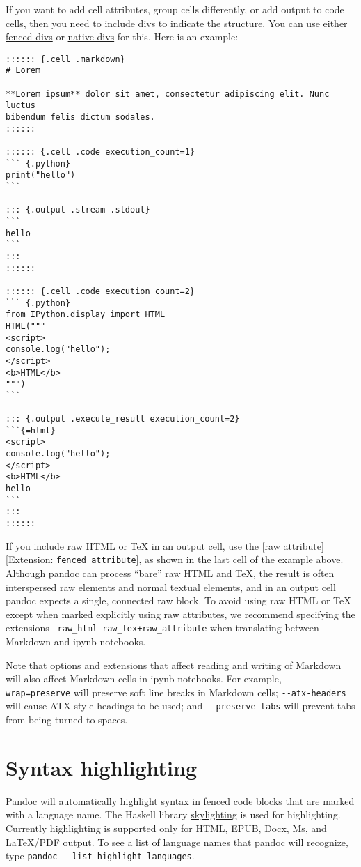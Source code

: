 \documentclass[
]{article}
\begin{document}
If you want to add cell attributes, group cells differently, or add
output to code cells, then you need to include divs to indicate the
structure. You can use either
\protect\hyperlink{extension-fenced_divs}{fenced divs} or
\protect\hyperlink{extension-native_divs}{native divs} for this. Here is
an example:

\begin{verbatim}
:::::: {.cell .markdown}
# Lorem

**Lorem ipsum** dolor sit amet, consectetur adipiscing elit. Nunc luctus
bibendum felis dictum sodales.
::::::

:::::: {.cell .code execution_count=1}
``` {.python}
print("hello")
```

::: {.output .stream .stdout}
```
hello
```
:::
::::::

:::::: {.cell .code execution_count=2}
``` {.python}
from IPython.display import HTML
HTML("""
<script>
console.log("hello");
</script>
<b>HTML</b>
""")
```

::: {.output .execute_result execution_count=2}
```{=html}
<script>
console.log("hello");
</script>
<b>HTML</b>
hello
```
:::
::::::
\end{verbatim}

If you include raw HTML or TeX in an output cell, use the {[}raw
attribute{]}{[}Extension: \texttt{fenced\_attribute}{]}, as shown in the
last cell of the example above. Although pandoc can process ``bare'' raw
HTML and TeX, the result is often interspersed raw elements and normal
textual elements, and in an output cell pandoc expects a single,
connected raw block. To avoid using raw HTML or TeX except when marked
explicitly using raw attributes, we recommend specifying the extensions
\texttt{-raw\_html-raw\_tex+raw\_attribute} when translating between
Markdown and ipynb notebooks.

Note that options and extensions that affect reading and writing of
Markdown will also affect Markdown cells in ipynb notebooks. For
example, \texttt{-\/-wrap=preserve} will preserve soft line breaks in
Markdown cells; \texttt{-\/-atx-headers} will cause ATX-style headings
to be used; and \texttt{-\/-preserve-tabs} will prevent tabs from being
turned to spaces.

\hypertarget{syntax-highlighting}{%
\section{Syntax highlighting}\label{syntax-highlighting}}

Pandoc will automatically highlight syntax in
\protect\hyperlink{fenced-code-blocks}{fenced code blocks} that are
marked with a language name. The Haskell library
\href{https://github.com/jgm/skylighting}{skylighting} is used for
highlighting. Currently highlighting is supported only for HTML, EPUB,
Docx, Ms, and LaTeX/PDF output. To see a list of language names that
pandoc will recognize, type
\texttt{pandoc\ -\/-list-highlight-languages}.
\end{document}
